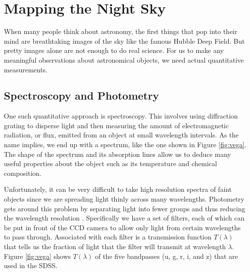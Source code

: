 
\chapter{Mapping the Night Sky}
\label{cha:astro}

When many people think about astronomy, the first things that pop into their mind are breathtaking
images of the sky like the famous Hubble Deep Field. But pretty images alone are not enough to do
real science. For us to make any meaningful observations about astronomical objects, we need actual
quantitative measurements.

\section{Spectroscopy and Photometry}  
\label{sec:spec}

One such quantitative approach is spectroscopy. This involves using diffraction grating to disperse
light and then measuring the amount of electromagnetic radiation, or flux, emitted from an object
at small wavelength intervals. As the name implies, we end up with a spectrum, like the one shown
in Figure \ref{fig:vega}. The shape of the spectrum and its absorption lines allow us to deduce
many useful properties about the object such as its temperature and chemical composition.

Unfortunately, it can be very difficult to take high resolution spectra of faint objects since we
are spreading light thinly across many wavelengths. Photometry gets around this problem by
separating light into fewer groups and thus reducing the wavelength resolution \cite[Chapter
1]{romanishin02}. Specifically we have a set of filters, each of which can be put in front of the
CCD camera to allow only light from certain wavelengths to pass through. Associated with each
filter is a transmission function $T(\lambda)$ that tells us the fraction of light that the filter
will transmit at wavelength $\lambda$. Figure \ref{fig:vega} shows $T(\lambda)$ of the five
bandpasses (u, g, r, i, and z) that are used in the SDSS.

